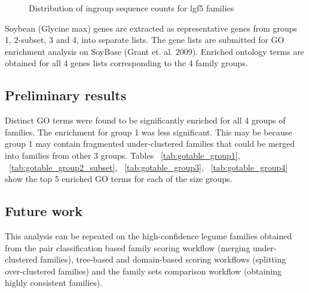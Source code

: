 \documentclass{article}
\begin{document}
		\begin{figure}[h!]
			\caption{Distribution of ingroup sequence counts for lgf5 families}
			\label{fig:hist_lgf5_family_size_groups}
		\end{figure}
	
		Soybean (Glycine max) genes are extracted as representative genes from groups 1, 2-subset, 3 and 4, into separate lists. The gene lists are submitted for GO enrichment analysis on SoyBase (Grant et. al. 2009). Enriched ontology terms are obtained for all 4 genes lists corresponding to the 4 family groups.
		
		\subsection{Preliminary results}
		Distinct GO terms were found to be significantly enriched for all 4 groups of families. The enrichment for group 1 was less significant. This may be because group 1 may contain fragmented under-clustered families that could be merged into families from other 3 groups. Tables ~\ref{tab:gotable_group1}, ~\ref{tab:gotable_group2_subset}, ~\ref{tab:gotable_group3}, ~\ref{tab:gotable_group4} show the top 5 enriched GO terms for each of the size groups.
		
		\subsection{Future work}
		This analysis can be repeated on the high-confidence legume families obtained from the pair classification based family scoring workflow (merging under-clustered families), tree-based and domain-based scoring workflows (splitting over-clustered families) and the family sets comparison workflow (obtaining highly consistent families). 
		
\end{document}
